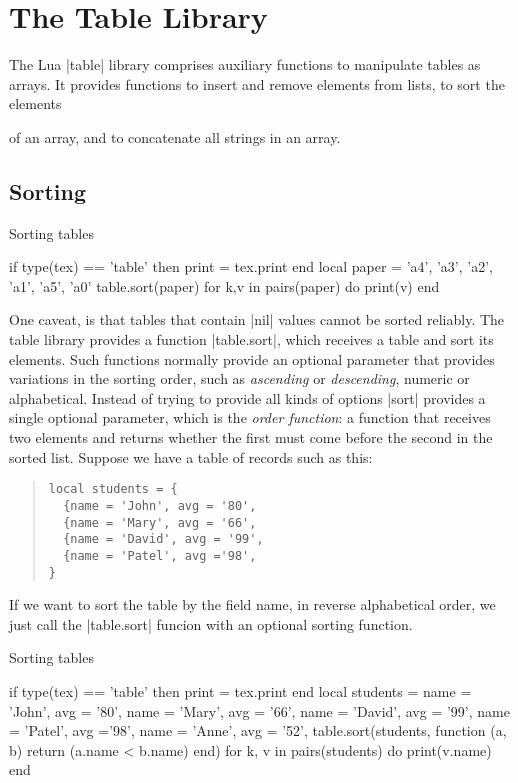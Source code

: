\section{The Table Library}
The Lua |table| library comprises auxiliary functions to manipulate tables as arrays.
It provides functions to insert and remove elements from lists, to sort the elements

of an array, and to concatenate all strings in an array.
\subsection{Sorting}

\begin{texexample}{Sorting tables}{}
\begin{luacode}
if type(tex) == 'table' then print = tex.print end
local paper = {'a4', 'a3', 'a2', 'a1', 'a5', 'a0' }
table.sort(paper)
for k,v in pairs(paper) do
   print(v)
end
\end{luacode}
\end{texexample}

One caveat, is that tables that contain |nil| values cannot be sorted reliably. The table library provides a function |table.sort|, which receives a table and sort its elements. Such functions normally provide an optional parameter that provides variations in the sorting order, such as \emph{ascending} or \emph{descending}, numeric or alphabetical. Instead of trying to provide all kinds of options |sort| provides a single optional parameter, which is the \emph{order function}: a function that receives two elements and returns whether the first must come before the second in the 
sorted list. Suppose we have a table of records such as this:

\begin{quote}
\begin{verbatim}
local students = {
  {name = 'John', avg = '80',
  {name = 'Mary', avg = '66',
  {name = 'David', avg = '99', 
  {name = 'Patel', avg ='98',
}
\end{verbatim}
\end{quote}

If we want to sort the table by the field name, in reverse alphabetical order, we
just call the |table.sort|  funcion with an optional sorting function.

\begin{texexample}{Sorting tables}{}
\begin{luacode}
if type(tex) == 'table' then print = tex.print end
local students = {
  {name = 'John', avg = '80'},
  {name = 'Mary', avg = '66'},
  {name = 'David', avg = '99'}, 
  {name = 'Patel', avg ='98'},
  {name = 'Anne', avg = '52'},
}
table.sort(students, function (a, b) return (a.name < b.name) end)
for k, v in pairs(students) do
  print(v.name)
end
\end{luacode}
\end{texexample}

